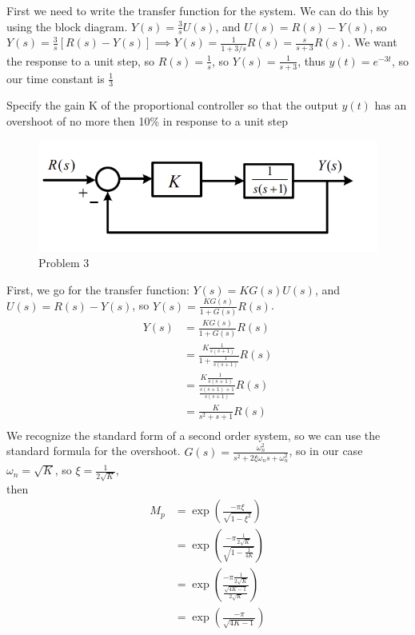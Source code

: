 \documentclass[11pt]{article}
\begin{document}
\soln

First we need to write the transfer function for the system. We can do this by using the block diagram.
$Y(s) = \frac{3}{s}U(s)$, and $U(s) = R(s) - Y(s)$, so \\
$Y(s) = \frac{3}{s} \left[R(s) - Y(s) \right] \implies 
Y(s) = \frac{1}{1 + 3/s}R(s) = \frac{s}{s + 3}R(s)$.
We want the response to a unit step, so $R(s) = \frac{1}{s}$, so $Y(s) = \frac{1}{s+3}$,
thus $y(t) = e^{-3t}$, so our time constant is $\frac{1}{3}$


Specify the gain K
of the proportional controller so that the output $y(t)$ has an overshoot of no more then 10\%
in response to a unit step

\begin{figure}[h] 
    \centering
    \includegraphics[width=0.55 \linewidth]{prob3}
    \caption{Problem 3}
    \label{fig:p3}
\end{figure}

\soln

First, we go for the transfer function:
$Y(s) = K G(s) U(s)$, and $U(s) = R(s) - Y(s)$, so $Y(s) = \frac{K G(s)}{1 + G(s)}R(s)$.
\begin{align*}
    Y(s) &= \frac{K G(s)}{1 + G(s)} R(s)\\
    &= \frac{K \frac{1}{s(s+1)}}{1 + \frac{1}{s(s+1)}} R(s)\\
    &= \frac{K \frac{1}{s(s+1)}}{\frac{s(s+1) + 1}{s(s+1)}} R(s)\\
    &= \frac{K}{s^2 + s + 1} R(s)\\
\end{align*}
We recognize the standard form of a second order system, so we can use the standard formula for the overshoot.
$G(s) = \frac{\omega_n^2}{s^2 + 2 \xi \omega_n s + \omega_n^2}$,
so in our case $\omega_n = \sqrt{K}$, so $\xi = \frac{1}{2 \sqrt{K}}$,\\
then \begin{align*}
    M_p &= \exp\left(\frac{-\pi \xi}{\sqrt{1 - \xi^2}}\right) \\
    &= \exp\left(\frac{-\pi \frac{1}{2 \sqrt{K}}}{\sqrt{1 - \frac{1}{4 K}}}\right) \\
    &= \exp\left(\frac{-\pi \frac{1}{2 \sqrt{K}}}{\frac{\sqrt{4K - 1}}{2 \sqrt{K}}}\right) \\
    &= \exp\left(\frac{-\pi}{\sqrt{4K - 1}}\right) \\
\end{align*}
\end{document}
